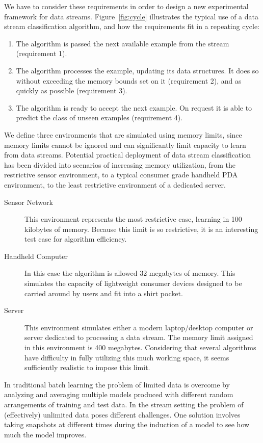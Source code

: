 \documentclass[a4paper,12pt,twoside]{book}
\begin{document}
We have to consider these requirements in order to design a new experimental
framework for data streams.
Figure~\ref{fig:cycle} illustrates the typical use of a data stream 
classification algorithm, and how the requirements fit
in a repeating cycle:
\begin{enumerate}
\item  The algorithm is passed the next available example from the stream
   (requirement 1).
\item  The algorithm processes the example, updating its data structures. It
   does so without exceeding the memory bounds set on it (requirement 2),
   and as quickly as possible (requirement 3).
\item  The algorithm is ready to accept the next example. On request it is
   able to predict the class of unseen examples
   (requirement 4).
\end{enumerate}
\BEGINOMIT
We define three environments that are simulated using memory limits, 
since memory limits cannot be ignored and can significantly limit capacity
to learn from data streams. Potential practical deployment of data stream
classification has been divided into scenarios of increasing memory utilization,
from the restrictive sensor environment, to a typical consumer grade handheld
PDA environment, to the least restrictive environment of a dedicated server.

\begin{description}
\item[Sensor Network] This environment represents the most restrictive case, 
learning in 100 kilobytes of memory. Because this limit is so restrictive,
it is an interesting test case for algorithm efficiency.

\item[Handheld Computer] In this case the algorithm is allowed 32 megabytes of 
memory. This simulates the capacity of lightweight consumer devices designed to
be carried around by users and fit into a shirt pocket.

\item[Server] This environment simulates either a modern laptop/desktop computer
or server dedicated to processing a data stream. The memory limit assigned in 
this environment is 400 megabytes.  Considering that several algorithms have 
difficulty in fully utilizing this much working space, it seems sufficiently 
realistic to impose this limit.

\end{description}
\ENDOMIT
In traditional batch learning the problem of limited data is overcome
by analyzing and averaging multiple models produced with different random
arrangements of training and test data. In the stream setting the problem of
(effectively) unlimited data poses different challenges. One solution involves
taking snapshots at different times during the induction of a model to see how
much the model improves.
\end{document}
